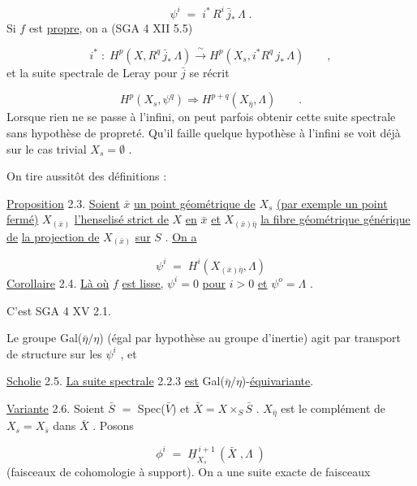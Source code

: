 \begin{equation*}\tag{2.2.1}
\psi^i \;=\; i^{*}\, R^i\, \bar{j}_{*}\, \Lambda \;.
\end{equation*}
Si  $f$  est \underline{propre}, on a (SGA 4 XII 5.5)

\begin{equation*}\tag{2.2.2}
i^{*} \;:\; H^p(X,R^q\,\bar{j}_{*}\,\Lambda) \xrightarrow{\ \sim\ } H^p(X_s,i^{*}R^q\,j_{*}\,\Lambda) \qquad ,
\end{equation*}
et la suite spectrale de Leray pour  $\bar{j}$  se récrit

\begin{equation*}\tag{2.2.3}
H^p(X_s,\psi^q) \Longrightarrow H^{p+q}(X_{\bar{\eta}},\Lambda) \qquad .
\end{equation*}
Lorsque rien ne se passe à l'infini, on peut parfois obtenir cette suite spectrale sans hypothèse de propreté.  Qu'il faille quelque hypothèse à l'infini se voit déjà sur le cas trivial  $X_s = \emptyset$ .


On tire aussitôt des définitions :

\underline{Proposition} 2.3.  \underline{Soient}  $\bar{x}$  \underline{un point géométrique de}  $X_s$  \underline{(par exemple un point fermé)} $X_{(\bar{x})}$  \underline{l'henselisé strict de}  $X$  \underline{en}  $\bar{x}$  \underline{et}  $X_{(\bar{x})\bar{\eta}}$   \underline{la fibre géométrique générique de} \underline{la projection de}  $X_{(\bar{x})}$  \underline{sur}  $S$ .  \underline{On a}

\begin{equation*}
\psi^i \;=\; H^i(X_{(\bar{x})\bar{\eta}},\Lambda)
\end{equation*}
\underline{Corollaire} 2.4.  \underline{Là où}  $f$  \underline{est lisse,}  $\psi^i = 0$  \underline{pour}  $i > 0$  \underline{et}  $\psi^{o} = \Lambda$ .

C'est SGA 4 XV 2.1.

Le groupe  Gal($\bar{\eta}/\eta$)  (égal par hypothèse au groupe d'inertie) agit par transport de structure sur les   $\psi^i$ , et

\underline{Scholie} 2.5.  \underline{La suite spectrale} 2.2.3 \underline{est}  Gal($\bar{\eta}/\eta$)-\underline{équivariante}.

\underline{Variante} 2.6.  Soient  $\bar{S}$ $=$ Spec($\bar{V}$)  et  $\bar{X} = X \times_S \bar{S}$ .  $X_{\bar{\eta}}$  est le complément de $X_s = X_{\bar{s}}$  dans  $\bar{X}$ . Posons

\begin{equation*}
\phi^i \;=\; \underline{H}^{\,i+1}_{X_s}\,(\bar{X}\;,\Lambda\;)
\end{equation*}
(faisceaux de cohomologie à support). On a une suite exacte de faisceaux

